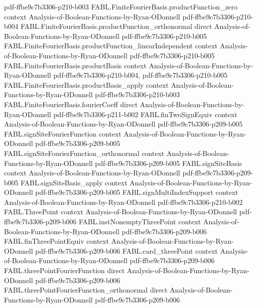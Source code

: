 \begin{theorem}
  {pdf-ffbe9c7b3306-p210-b003}
\proofstep
  {FABL.FiniteFourierBasis.productFunction_zero}
  {context}
  {Analysis-of-Boolean-Functions-by-Ryan-ODonnell}
  {pdf-ffbe9c7b3306-p210-b004}
\proofstep
  {FABL.FiniteFourierBasis.productFunction_orthonormal}
  {direct}
  {Analysis-of-Boolean-Functions-by-Ryan-ODonnell}
  {pdf-ffbe9c7b3306-p210-b005}
\proofstep
  {FABL.FiniteFourierBasis.productFunction_linearIndependent}
  {context}
  {Analysis-of-Boolean-Functions-by-Ryan-ODonnell}
  {pdf-ffbe9c7b3306-p210-b005}
\proofstep
  {FABL.FiniteFourierBasis.productBasis}
  {context}
  {Analysis-of-Boolean-Functions-by-Ryan-ODonnell}
  {pdf-ffbe9c7b3306-p210-b004,
    pdf-ffbe9c7b3306-p210-b005}
\proofstep
  {FABL.FiniteFourierBasis.productBasis_apply}
  {context}
  {Analysis-of-Boolean-Functions-by-Ryan-ODonnell}
  {pdf-ffbe9c7b3306-p210-b003}
\proofstep
  {FABL.FiniteFourierBasis.fourierCoeff}
  {direct}
  {Analysis-of-Boolean-Functions-by-Ryan-ODonnell}
  {pdf-ffbe9c7b3306-p211-b002}
\proofstep
  {FABL.finTwoSignEquiv}
  {context}
  {Analysis-of-Boolean-Functions-by-Ryan-ODonnell}
  {pdf-ffbe9c7b3306-p209-b005}
\proofstep
  {FABL.signSiteFourierFunction}
  {context}
  {Analysis-of-Boolean-Functions-by-Ryan-ODonnell}
  {pdf-ffbe9c7b3306-p209-b005}
\proofstep
  {FABL.signSiteFourierFunction_orthonormal}
  {context}
  {Analysis-of-Boolean-Functions-by-Ryan-ODonnell}
  {pdf-ffbe9c7b3306-p209-b005}
\proofstep
  {FABL.signSiteBasis}
  {context}
  {Analysis-of-Boolean-Functions-by-Ryan-ODonnell}
  {pdf-ffbe9c7b3306-p209-b005}
\proofstep
  {FABL.signSiteBasis_apply}
  {context}
  {Analysis-of-Boolean-Functions-by-Ryan-ODonnell}
  {pdf-ffbe9c7b3306-p209-b005}
\proofstep
  {FABL.signMultiIndexSupport}
  {context}
  {Analysis-of-Boolean-Functions-by-Ryan-ODonnell}
  {pdf-ffbe9c7b3306-p210-b002}
\proofstep
  {FABL.ThreePoint}
  {context}
  {Analysis-of-Boolean-Functions-by-Ryan-ODonnell}
  {pdf-ffbe9c7b3306-p209-b006}
\proofstep
  {FABL.instNonemptyThreePoint}
  {context}
  {Analysis-of-Boolean-Functions-by-Ryan-ODonnell}
  {pdf-ffbe9c7b3306-p209-b006}
\proofstep
  {FABL.finThreePointEquiv}
  {context}
  {Analysis-of-Boolean-Functions-by-Ryan-ODonnell}
  {pdf-ffbe9c7b3306-p209-b006}
\proofstep
  {FABL.card_threePoint}
  {context}
  {Analysis-of-Boolean-Functions-by-Ryan-ODonnell}
  {pdf-ffbe9c7b3306-p209-b006}
\proofstep
  {FABL.threePointFourierFunction}
  {direct}
  {Analysis-of-Boolean-Functions-by-Ryan-ODonnell}
  {pdf-ffbe9c7b3306-p209-b006}
\proofstep
  {FABL.threePointFourierFunction_orthonormal}
  {direct}
  {Analysis-of-Boolean-Functions-by-Ryan-ODonnell}
  {pdf-ffbe9c7b3306-p209-b006}

\end{theorem}
